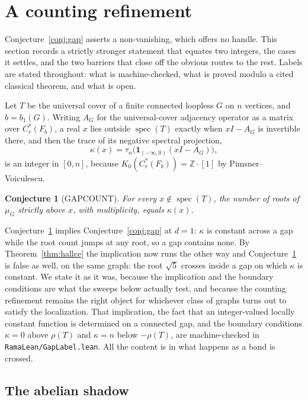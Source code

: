 \documentclass[11pt]{article}
\newtheorem{conjecture}[theorem]{Conjecture}
\theoremstyle{remark}
\begin{document}
\section{A counting refinement}\label{sec:gapcount}

Conjecture~\ref{conj:gap} asserts a non-vanishing, which offers no handle. This section
records a strictly stronger statement that equates two integers, the cases it settles, and
the two barriers that close off the obvious routes to the rest. Labels are stated
throughout: what is machine-checked, what is proved modulo a cited classical theorem, and
what is open.

Let $T$ be the universal cover of a finite connected loopless $G$ on $n$ vertices, and
$b=b_1(G)$. Writing $A_G$ for the universal-cover adjacency operator as a matrix over
$C^*_r(F_b)$, a real $x$ lies outside $\operatorname{spec}(T)$ exactly when $xI-A_G$ is
invertible there, and then the trace of its negative spectral projection,
\[
\kappa(x)=\tau_n\bigl(\mathbf 1_{(-\infty,0)}(xI-A_G)\bigr),
\]
is an integer in $[0,n]$, because $K_0(C^*_r(F_b))=\mathbb{Z}\cdot[1]$ by Pimsner--Voiculescu.

\begin{conjecture}[GAPCOUNT]\label{conj:gapcount}
For every $x\notin\operatorname{spec}(T)$, the number of roots of $\mu_G$ strictly above
$x$, with multiplicity, equals $\kappa(x)$.
\end{conjecture}

Conjecture~\ref{conj:gapcount} implies Conjecture~\ref{conj:gap} at $d=1$: $\kappa$ is
constant across a gap while the root count jumps at any root, so a gap contains none.
By Theorem~\ref{thm:hallce} the implication now runs the other way and
Conjecture~\ref{conj:gapcount} is false as well, on the same graph: the root $\sqrt5$
crosses inside a gap on which $\kappa$ is constant. We state it as it was, because the
implication and the boundary conditions are what the sweeps below actually test, and
because the counting refinement remains the right object for whichever class of graphs
turns out to satisfy the localization. That
implication, the fact that an integer-valued locally constant function is determined on a
connected gap, and the boundary conditions $\kappa=0$ above $\rho(T)$ and $\kappa=n$ below
$-\rho(T)$, are machine-checked in \texttt{RamaLean/GapLabel.lean}. All the content is in
what happens as a band is crossed.

\subsection{The abelian shadow}
\end{document}
